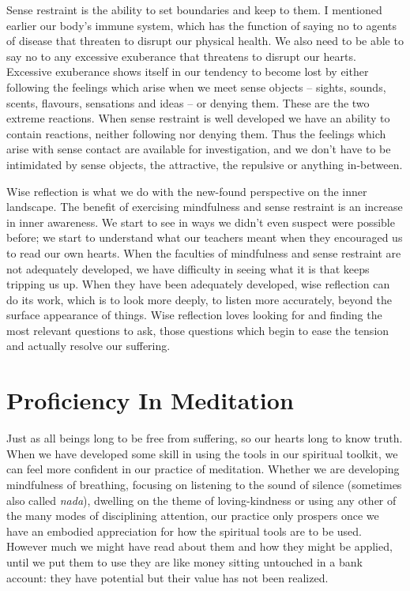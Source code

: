 Sense restraint is the ability to set boundaries and keep to them. I
mentioned earlier our body’s immune system, which has the function of
saying no to agents of disease that threaten to disrupt our physical
health. We also need to be able to say no to any excessive exuberance
that threatens to disrupt our hearts. Excessive exuberance shows itself
in our tendency to become lost by either following the feelings which
arise when we meet sense objects – sights, sounds, scents, flavours,
sensations and ideas – or denying them. These are the two extreme
reactions. When sense restraint is well developed we have an ability to
contain reactions, neither following nor denying them. Thus the feelings
which arise with sense contact are available for investigation, and we
don’t have to be intimidated by sense objects, the attractive, the
repulsive or anything in-between.

Wise reflection is what we do with the new-found perspective on the
inner landscape. The benefit of exercising mindfulness and sense
restraint is an increase in inner awareness. We start to see in ways we
didn’t even suspect were possible before; we start to understand what
our teachers meant when they encouraged us to read our own hearts. When
the faculties of mindfulness and sense restraint are not adequately
developed, we have difficulty in seeing what it is that keeps tripping
us up. When they have been adequately developed, wise reflection can do
its work, which is to look more deeply, to listen more accurately,
beyond the surface appearance of things. Wise reflection loves looking
for and finding the most relevant questions to ask, those questions
which begin to ease the tension and actually resolve our suffering.

\section{Proficiency In Meditation}

Just as all beings long to be free from suffering, so our hearts long
to know truth. When we have developed some skill in using the tools in
our spiritual toolkit, we can feel more confident in our practice of
meditation. Whether we are developing mindfulness of breathing, focusing
on listening to the sound of silence
(sometimes also called
\emph{nada})\cite{inner-listening},
dwelling on the theme of loving-kindness or using any other of the
many modes of disciplining attention, our practice only prospers once we
have an embodied appreciation for how the spiritual tools are to be
used. However much we might have read about them and how they might be
applied, until we put them to use they are like money sitting untouched
in a bank account: they have potential but their value has not been
realized.

